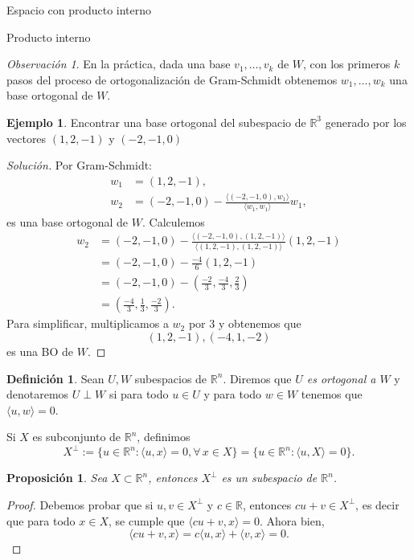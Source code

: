 \documentclass[a4paper,12pt,twoside,spanish,reqno]{amsbook}
\newtheorem{proposicion}[teorema]{Proposici\'on}
\theoremstyle{definition}
\newtheorem{definicion}{Definici\'on}[section]
\newtheorem{ejemplo}{Ejemplo}[section]
\theoremstyle{remark}
\newtheorem{obs}{Observaci\'on}[section]
\newcommand{\la}{\langle}
\newcommand{\ra}{\rangle}
\newcommand{\R}{\mathbb R}
\begin{document}
\begin{chapter}{Espacio con producto interno}
\begin{section}{Producto interno}
\begin{obs}
		En la práctica, dada una base $v_1,\ldots,v_k$ de $W$,  con los primeros $k$ pasos del proceso de ortogonalización de Gram-Schmidt obtenemos $ w_{1},\ldots,w_k $ una base ortogonal de $W$.
		\end{obs}
		
		\begin{ejemplo}
			Encontrar una base ortogonal del subespacio de $\R^3$ generado por los vectores $(1,2,-1)$ y $(-2,-1,0)$
			\begin{proof}[Solución] Por Gram-Schmidt:
				\begin{align*}
				w_1 &= (1,2,-1),  \\
				w_2 &= (-2,-1,0) - \frac{\la (-2,-1,0),w_1\ra}{\la w_1,w_1\ra}w_1,
				\end{align*}
				es una base ortogonal de $W$. Calculemos 
				\begin{align*}
					w_2  &= (-2,-1,0) - \frac{\la (-2,-1,0),(1,2,-1)\ra}{\la(1,2,-1),(1,2,-1)\ra}(1,2,-1)\\
					&= (-2,-1,0) - \frac{-4}{6}(1,2,-1) \\
					&= (-2,-1,0) - (\frac{-2}{3},\frac{-4}{3},\frac{2}{3}) \\
					&= (\frac{-4}{3},\frac{1}{3},\frac{-2}{3}).
				\end{align*}
				Para simplificar, multiplicamos a $w_2$ por $3$ y obtenemos que
				\begin{equation*}
					(1,2,-1), (-4,1,-2)
				\end{equation*} 
				es una BO de $W$. 
				
			\end{proof}  
		\end{ejemplo}
		
		\medskip
		
		\begin{definicion}  Sean $U, W$ subespacios de $\R^n$. Diremos que \textit{$U$ es ortogonal a $W$} y denotaremos $U \perp W$ si  para todo $u \in U$ y para todo $w \in W$ tenemos que $ \la u,w\ra =0$. 
			
			Si $X$ es subconjunto de $\R^n$,  definimos 
			$$
			X^\perp := \{u \in \R^n: \la u,x\ra = 0, \forall\, x \in X\} = \{u \in \R^n: \la u,X\ra = 0\}.
			$$ 
		\end{definicion}
		
		\begin{proposicion}
			Sea  $X \subset \R^n$, entonces $X^\perp$  es un subespacio de $\R^n$.
		\end{proposicion}
		\begin{proof}
			Debemos probar que si $u,v \in X^\perp$ y $c \in \R$,  entonces $cu+v \in X^\perp$,  es decir que para todo $x \in X$,  se cumple que  $\la cu+v,x\ra=0$. Ahora bien,
			$$
			\la cu+v,x\ra= c\la u,x\ra +\la v,x\ra= 0.
			$$
		\end{proof}
		

\end{section}
\end{chapter}
\end{document}
